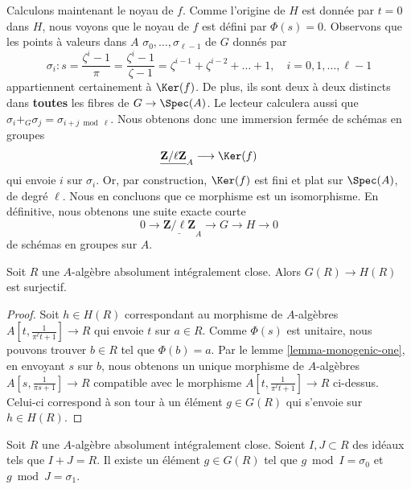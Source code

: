 \noindent
Calculons maintenant le noyau de $f$. Comme l'origine de $H$ est
donnée par $t = 0$ dans $H$, nous voyons que le noyau de $f$ est défini
par $\Phi(s) = 0$. Observons que les points à valeurs dans $A$
$\sigma_0, \ldots, \sigma_{\ell - 1}$
de $G$ donnés par
$$
\sigma_i :
s = \frac{\zeta^i - 1}{\pi} = \frac{\zeta^i - 1}{\zeta - 1} =
\zeta^{i - 1} + \zeta^{i - 2} + \ldots + 1,\quad
i = 0, 1, \ldots, \ell - 1
$$
appartiennent certainement à $\Ker(f)$. De plus, ils sont deux à deux
distincts dans {\bf toutes} les fibres de $G \to \Spec(A)$. Le lecteur
calculera aussi que $\sigma_i +_G \sigma_j = \sigma_{i + j \bmod \ell}$.
Nous obtenons donc une immersion fermée de schémas en groupes
$$
\underline{\mathbf{Z}/\ell \mathbf{Z}}_A \longrightarrow \Ker(f)
$$
qui envoie $i$ sur $\sigma_i$. Or, par construction, $\Ker(f)$
est fini et plat sur $\Spec(A)$, de degré $\ell$. Nous en concluons
que ce morphisme est un isomorphisme. En définitive, nous obtenons
une suite exacte courte
\begin{equation}
\label{equation-ses}
0 \to
\underline{\mathbf{Z}/\ell \mathbf{Z}}_A
\to G
\to H
\to 0
\end{equation}
de schémas en groupes sur $A$.

\begin{lemma}
\label{lemma-lift-points-H-to-G}
Soit $R$ une $A$-algèbre absolument intégralement close. Alors
$G(R) \to H(R)$ est surjectif.
\end{lemma}

\begin{proof}
Soit $h \in H(R)$ correspondant au morphisme de $A$-algèbres
$A[t, \frac{1}{\pi^\ell t + 1}] \to R$ qui envoie $t$ sur $a \in R$.
Comme $\Phi(s)$ est unitaire, nous pouvons trouver $b \in R$
tel que $\Phi(b) = a$. Par le lemme \ref{lemma-monogenic-one},
en envoyant $s$ sur $b$, nous obtenons un unique morphisme de $A$-algèbres
$A[s, \frac{1}{\pi s + 1}] \to R$ compatible
avec le morphisme $A[t, \frac{1}{\pi^\ell t + 1}] \to R$ ci-dessus.
Celui-ci correspond à son tour à un élément $g \in G(R)$
qui s'envoie sur $h \in H(R)$.
\end{proof}

\begin{lemma}
\label{lemma-interpolate}
Soit $R$ une $A$-algèbre absolument intégralement close.
Soient $I, J \subset R$ des idéaux tels que $I + J = R$.
Il existe un élément $g \in G(R)$ tel
que $g \bmod I = \sigma_0$ et $g \bmod J = \sigma_1$.
\end{lemma}

